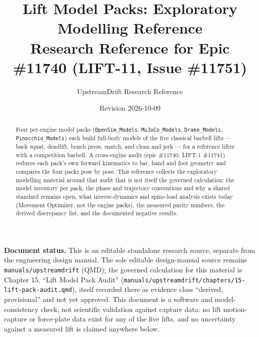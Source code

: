 \documentclass[11pt,a4paper]{article}
\title{Lift Model Packs: Exploratory Modelling Reference\\[4pt]
\large Research Reference for Epic \#11740 (LIFT-11, Issue \#11751)}
\author{UpstreamDrift Research Reference}
\date{Revision 2026-10-09}
\begin{document}
\maketitle

\begin{abstract}
Four per-engine model packs (\texttt{OpenSim\_Models}, \texttt{MuJoCo\_Models},
\texttt{Drake\_Models}, \texttt{Pinocchio\_Models}) each build full-body models
of the five classical barbell lifts --- back squat, deadlift, bench press,
snatch, and clean and jerk --- for a reference lifter with a competition
barbell. A cross-engine audit (epic \#11740, LIFT-1 \#11741) reduces each
pack's own forward kinematics to bar, hand and foot geometry and compares the
four packs pose by pose. This reference collects the exploratory modelling
material around that audit that is not itself the governed calculation:
the model inventory per pack, the phase and trajectory conventions and why a
shared standard remains open, what inverse-dynamics and spine-load analysis
exists today (Movement Optimizer, not the engine packs), the measured parity
numbers, the derived discrepancy list, and the documented negative results.
\end{abstract}

\noindent\textbf{Document status.} This is an editable standalone research
source, separate from the engineering design manual. The sole editable
design-manual source remains \texttt{manuals/upstreamdrift} (QMD); the
governed calculation for this material is Chapter 15, ``Lift Model Pack
Audit'' (\texttt{manuals/upstreamdrift/chapters/15-lift-pack-audit.qmd}),
itself recorded there as evidence class ``derived, provisional'' and not yet
approved. This document is a software and model-consistency check, not
scientific validation against capture data: no lift motion-capture or
force-plate data exist for any of the five lifts, and no uncertainty against
a measured lift is claimed anywhere below.
\end{document}
